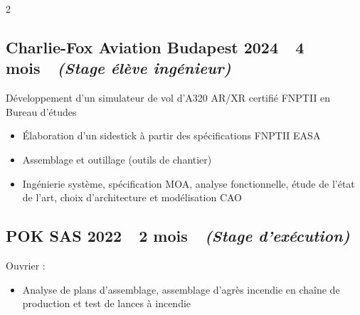 \documentclass[10pt,a4paper]{article}
\newcommand{\datetag}[1]{\hfill{\small\bfseries #1}}
\begin{document}
\begin{paracol}{2}
\subsection{Charlie-Fox Aviation Budapest \datetag{2024\ \ 4 mois\ \ {\normalfont\itshape(Stage élève ingénieur)}}}
Développement d'un simulateur de vol d'A320 AR/XR certifié FNPTII en
Bureau d'études
\begin{itemize}
    \item Élaboration d'un sidestick à partir des spécifications FNPTII EASA
    \item Assemblage et outillage (outils de chantier)
    \item Ingénierie système, spécification MOA, analyse fonctionnelle,
          étude de l'état de l'art, choix d'architecture et modélisation CAO
\end{itemize}

\subsection{POK SAS \datetag{2022\ \ 2 mois\ \ {\normalfont\itshape(Stage d'exécution)}}}
Ouvrier :
\begin{itemize}
    \item Analyse de plans d'assemblage, assemblage d'agrès incendie en
          chaîne de production et test de lances à incendie
\end{itemize}

\end{paracol}
\end{document}
